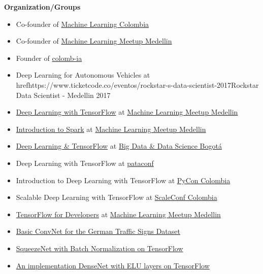 
\textbf{Organization/Groups}
\begin{itemize}
\tightlist
\item
  Co-founder of
  \href{https://www.facebook.com/groups/1766056600304468}{Machine
  Learning Colombia}
\item
  Co-founder of \href{https://www.meetup.com/es-ES/ml-medellin}{Machine
  Learning Meetup Medellin}
\item
  Founder of
  \href{https://github.com/colomb-ia/mision-vision}{colomb-ia}
\end{itemize}

\begin{itemize}
\tightlist
\item
  Deep Learning for Autonomous Vehicles at href{https://www.ticketcode.co/eventos/rockstar-s-data-scientist-2017}{Rockstar Data Scientist - Medellin 2017}
\item
  \href{https://www.meetup.com/es-ES/ml-medellin/events/231887878/}{Deep
  Learning with TensorFlow} at
  \href{https://www.meetup.com/es-ES/ml-medellin}{Machine Learning
  Meetup Medellin}
\item
  \href{https://www.meetup.com/es-ES/ml-medellin/events/232587669/}{Introduction
  to Spark} at \href{https://www.meetup.com/es-ES/ml-medellin}{Machine
  Learning Meetup Medellin}
\item
  \href{https://www.meetup.com/es-ES/Big-Data-Science-Bogota/events/233975872}{Deep
  Learning \& TensorFlow} at
  \href{https://www.meetup.com/es-ES/Big-Data-Science-Bogota/}{Big Data
  \& Data Science Bogotá}
\item
  Deep Learning with TensorFlow at \href{http://pataconf.com/}{pataconf}
\item
  Introduction to Deep Learning with TensorFlow at
  \href{http://www.pycon.co/}{PyCon Colombia}
\item
  Scalable Deep Learning with TensorFlow at
  \href{http://scaleconfco.com/}{ScaleConf Colombia}
\item
  \href{https://www.meetup.com/es-ES/ml-medellin/events/238072044/}{TensorFlow
  for Developers} at
  \href{https://www.meetup.com/es-ES/ml-medellin}{Machine Learning
  Meetup Medellin}
\end{itemize}


\begin{itemize}
\tightlist
\item
  \href{https://github.com/cgarciae/supervised-avanzado-german-traffic-signs/tree/feature/solucion-basica}{Basic
  ConvNet for the German Traffic Signs Dataset}
\item
  \href{https://github.com/cgarciae/supervised-avanzado-german-traffic-signs/tree/feature/batch-norm-squeeze-net}{SqueezeNet
  with Batch Normalization on TensorFlow}
\item
  \href{https://github.com/cgarciae/supervised-avanzado-german-traffic-signs/tree/feature/dense-net-elu-2}{An
  implementation DenseNet with ELU layers on TensorFlow}
\end{itemize}
